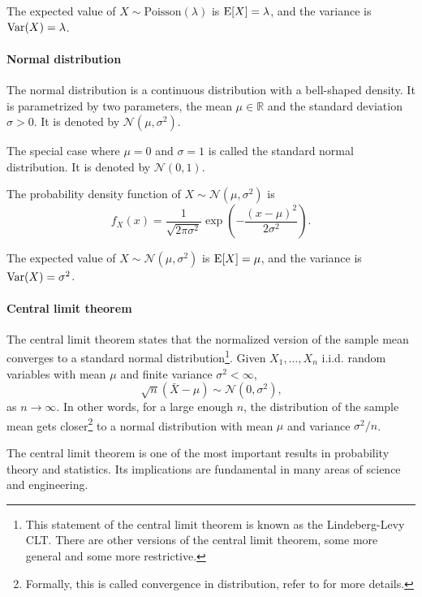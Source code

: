 The expected value of $X \sim \text{Poisson}(\lambda)$ is $\operatorname{E}[X] = \lambda$, and the
variance is $\operatorname{Var}(X) = \lambda$.

\paragraph{Normal distribution} The normal distribution is a continuous distribution
with a bell-shaped density.  It is parametrized by two parameters, the mean $\mu \in
\mathbb{R}$ and the standard deviation $\sigma > 0$.  It is denoted by
$\mathcal{N}(\mu, \sigma^2)$.

The special case where $\mu = 0$ and $\sigma = 1$ is called the standard normal
distribution.  It is denoted by $\mathcal{N}(0, 1)$.

The probability density function of $X \sim \mathcal{N}(\mu, \sigma^2)$ is
\begin{equation}
  \label{eq:normal}
  f_X(x) = \frac{1}{\sqrt{2 \pi \sigma^2}} \exp\left(-\frac{(x - \mu)^2}{2 \sigma^2}\right)\text{.}
\end{equation}

The expected value of $X \sim \mathcal{N}(\mu, \sigma^2)$ is $\operatorname{E}[X] = \mu$, and the
variance is $\operatorname{Var}(X) = \sigma^2$.

\paragraph{Central limit theorem}  The central limit theorem states that the normalized
version of the sample mean converges to a standard normal distribution\footnote{This
statement of the central limit theorem is known as the Lindeberg-Levy CLT.  There are
other versions of the central limit theorem, some more general and some more
restrictive.}. Given $X_1, \dots, X_n$ i.i.d. random variables with mean $\mu$ and finite
variance $\sigma^2 < \infty$,
\begin{equation*}
  \sqrt{n} (\bar{X} - \mu) \sim \mathcal{N}(0, \sigma^2)\text{,}
\end{equation*}
as $n \rightarrow \infty$.  In other words, for a large enough $n$, the distribution of
the sample mean gets closer\footnote{Formally, this is called convergence in distribution,
refer to  for more details.} to a normal distribution with mean
$\mu$ and variance $\sigma^2/n$.

The central limit theorem is one of the most important results in probability theory and
statistics.  Its implications are fundamental in many areas of science and engineering.

